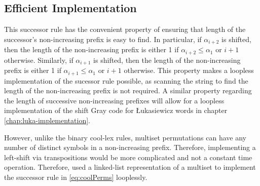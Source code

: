 



\subsection{Efficient Implementation}
This successor rule has the convenient property of ensuring that length of the successor's non-increasing prefix is easy to find.
In particular, if $\alpha_{i+2}$ is shifted, then the length of the non-increasing prefix is either 1 if $\alpha_{i+2}\le \alpha_1$ or $i+1$ otherwise. 
Similarly, if $\alpha_{i+1}$ is shifted, then the length of the non-increasing prefix is either 1 if $\alpha_{i+1}\le \alpha_1$ or $i+1$ otherwise. 
This property makes a loopless implementation of the sucessor rule possible, as scanning the string to find the length of the non-increasing prefix is not required.  
A similar property regarding the length of successive non-increasing prefixes will allow for a loopless implementation of the shift Gray code for Łukasiewicz words in chapter \ref{chap:luka-implementation}.

However, unlike the binary cool-lex rules, multiset permutations can have any number of distinct symbols in a non-increasing prefix.  Therefore, implementing a left-shift via transpositions would be more complicated and  not a constant time operation.  Therefore, \cite{williams2009loopless} used a linked-list representation of a multiset to implement the successor rule in \eqref{eq:coolPerms} looplessly.



